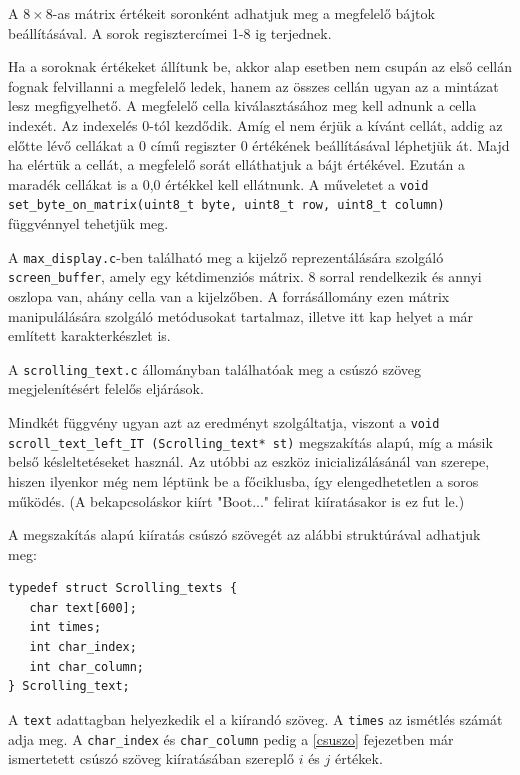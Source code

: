 \documentclass[a4paper, 12pt]{article}
\begin{document}
A $8\times 8$-as mátrix értékeit soronként adhatjuk meg a megfelelő bájtok beállításával. A sorok regisztercímei 1-8 ig terjednek.

Ha a soroknak értékeket állítunk be, akkor alap esetben nem csupán az első cellán fognak felvillanni a megfelelő ledek, hanem az összes cellán ugyan az a mintázat lesz megfigyelhető. A megfelelő cella kiválasztásához meg kell adnunk a cella indexét. Az indexelés 0-tól kezdődik. Amíg el nem érjük a kívánt cellát, addig az előtte lévő cellákat a 0 című regiszter 0 értékének beállításával léphetjük át. Majd ha elértük a cellát, a megfelelő sorát elláthatjuk a bájt értékével. Ezután a maradék cellákat is a 0,0 értékkel kell ellátnunk. A műveletet a \texttt{void set\_byte\_on\_matrix(uint8\_t byte, uint8\_t row, uint8\_t column)} függvénnyel tehetjük meg.

\bigskip

A \texttt{max\_display.c}-ben található meg a kijelző reprezentálására szolgáló \texttt{screen\_buffer}, amely egy kétdimenziós mátrix. 8 sorral rendelkezik és annyi oszlopa van, ahány cella van a kijelzőben.
A forrásállomány ezen mátrix manipulálására szolgáló metódusokat tartalmaz, illetve itt kap helyet a már említett karakterkészlet is.

\bigskip

A \texttt{scrolling\_text.c} állományban találhatóak meg a csúszó szöveg megjelenítésért felelős eljárások.

\noindent Mindkét függvény ugyan azt az eredményt szolgáltatja, viszont a \texttt{void scroll\_text\_left\_IT (Scrolling\_text* st)} megszakítás alapú, míg a másik belső késleltetéseket használ. Az utóbbi az eszköz inicializálásánál van szerepe, hiszen ilyenkor még nem léptünk be a főciklusba, így elengedhetetlen a soros működés. (A bekapcsoláskor kiírt "Boot..." felirat kiíratásakor is ez fut le.)

A megszakítás alapú kiíratás csúszó szövegét az alábbi struktúrával adhatjuk meg:
\begin{lstlisting}[style=CStyle]
typedef struct Scrolling_texts {
   char text[600];
   int times;
   int char_index;
   int char_column;
} Scrolling_text;
\end{lstlisting}
A \texttt{text} adattagban helyezkedik el a kiírandó szöveg. A \texttt{times} az ismétlés számát adja meg. A \texttt{char\_index} és \texttt{char\_column} pedig a \ref{csuszo} fejezetben már ismertetett csúszó szöveg kiíratásában szereplő $i$ és $j$ értékek. 

\bigskip
\end{document}
